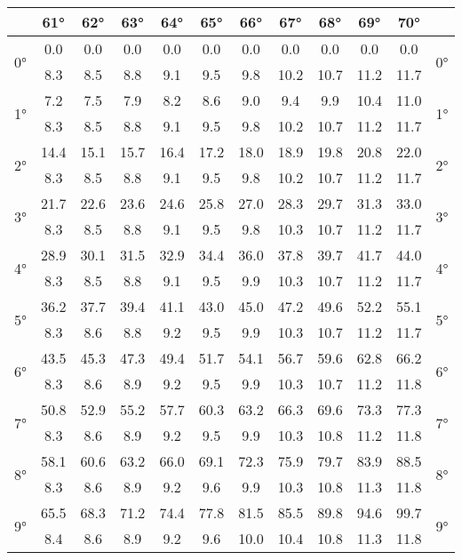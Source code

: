 \begin{footnotesize}\begin{tabular}{c || c | c | c | c | c | c | c | c | c | c || c}
		\space &61°&62°&63°&64°&65°&66°&67°&68°&69°&70°\\\hline\hline
		\multirow{2}{*}{0°}&0.0&0.0&0.0&0.0&0.0&0.0&0.0&0.0&0.0&0.0&\multirow{2}{*}{0°}\\ \space&8.3&8.5&8.8&9.1&9.5&9.8&10.2&10.7&11.2&11.7&\space\\\hline
		\multirow{2}{*}{1°}&7.2&7.5&7.9&8.2&8.6&9.0&9.4&9.9&10.4&11.0&\multirow{2}{*}{1°}\\ \space&8.3&8.5&8.8&9.1&9.5&9.8&10.2&10.7&11.2&11.7&\space\\\hline
		\multirow{2}{*}{2°}&14.4&15.1&15.7&16.4&17.2&18.0&18.9&19.8&20.8&22.0&\multirow{2}{*}{2°}\\ \space&8.3&8.5&8.8&9.1&9.5&9.8&10.2&10.7&11.2&11.7&\space\\\hline
		\multirow{2}{*}{3°}&21.7&22.6&23.6&24.6&25.8&27.0&28.3&29.7&31.3&33.0&\multirow{2}{*}{3°}\\ \space&8.3&8.5&8.8&9.1&9.5&9.8&10.3&10.7&11.2&11.7&\space\\\hline
		\multirow{2}{*}{4°}&28.9&30.1&31.5&32.9&34.4&36.0&37.8&39.7&41.7&44.0&\multirow{2}{*}{4°}\\ \space&8.3&8.5&8.8&9.1&9.5&9.9&10.3&10.7&11.2&11.7&\space\\\hline
		\multirow{2}{*}{5°}&36.2&37.7&39.4&41.1&43.0&45.0&47.2&49.6&52.2&55.1&\multirow{2}{*}{5°}\\ \space&8.3&8.6&8.8&9.2&9.5&9.9&10.3&10.7&11.2&11.7&\space\\\hline
		\multirow{2}{*}{6°}&43.5&45.3&47.3&49.4&51.7&54.1&56.7&59.6&62.8&66.2&\multirow{2}{*}{6°}\\ \space&8.3&8.6&8.9&9.2&9.5&9.9&10.3&10.7&11.2&11.8&\space\\\hline
		\multirow{2}{*}{7°}&50.8&52.9&55.2&57.7&60.3&63.2&66.3&69.6&73.3&77.3&\multirow{2}{*}{7°}\\ \space&8.3&8.6&8.9&9.2&9.5&9.9&10.3&10.8&11.2&11.8&\space\\\hline
		\multirow{2}{*}{8°}&58.1&60.6&63.2&66.0&69.1&72.3&75.9&79.7&83.9&88.5&\multirow{2}{*}{8°}\\ \space&8.3&8.6&8.9&9.2&9.6&9.9&10.3&10.8&11.3&11.8&\space\\\hline
		\multirow{2}{*}{9°}&65.5&68.3&71.2&74.4&77.8&81.5&85.5&89.8&94.6&99.7&\multirow{2}{*}{9°}\\ \space&8.4&8.6&8.9&9.2&9.6&10.0&10.4&10.8&11.3&11.8&\space\\\hline

\end{tabular}
\end{footnotesize}
